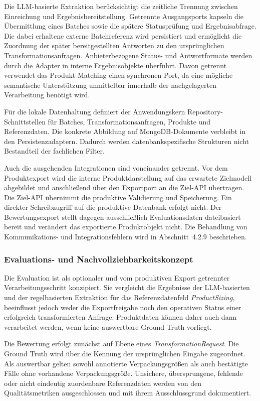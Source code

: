 Die LLM-basierte Extraktion berücksichtigt die zeitliche Trennung zwischen Einreichung und Ergebnisbereitstellung. Getrennte Ausgangsports kapseln die Übermittlung 
eines Batches sowie die spätere Statusprüfung und Ergebnisabfrage. Die dabei erhaltene externe Batchreferenz wird persistiert und ermöglicht die Zuordnung der später 
bereitgestellten Antworten zu den ursprünglichen Transformationsanfragen. Anbieterbezogene Status- und Antwortformate werden durch die Adapter in interne Ergebnisobjekte 
überführt. Davon getrennt verwendet das Produkt-Matching einen synchronen Port, da eine mögliche semantische Unterstützung unmittelbar innerhalb der nachgelagerten 
Verarbeitung benötigt wird.

Für die lokale Datenhaltung definiert der Anwendungskern Repository-Schnittstellen für Batches, Transformationsanfragen, Produkte und Referenzdaten. Die konkrete 
Abbildung auf MongoDB-Dokumente verbleibt in den Persistenzadaptern. Dadurch werden datenbankspezifische Strukturen nicht Bestandteil der fachlichen Filter.

Auch die ausgehenden Integrationen sind voneinander getrennt. Vor dem Produktexport wird die interne Produktdarstellung auf das erwartete Zielmodell abgebildet und 
anschließend über den Exportport an die Ziel-API übertragen. Die Ziel-API übernimmt die produktive Validierung und Speicherung. Ein direkter Schreibzugriff auf die 
produktive Datenbank erfolgt nicht. Der Bewertungsexport stellt dagegen ausschließlich Evaluationsdaten dateibasiert bereit und verändert das exportierte Produktobjekt 
nicht. Die Behandlung von Kommunikations- und Integrationsfehlern wird in Abschnitt~4.2.9 beschrieben.

\subsubsection{Evaluations- und Nachvollziehbarkeitskonzept}

Die Evaluation ist als optionaler und vom produktiven Export getrennter Verarbeitungsschritt konzipiert. Sie vergleicht die Ergebnisse der LLM-basierten und der 
regelbasierten Extraktion für das Referenzdatenfeld \textit{ProductSizing}, beeinflusst jedoch weder die Exportfreigabe noch den operativen Status einer erfolgreich 
transformierten Anfrage. Produktdaten können daher auch dann verarbeitet werden, wenn keine auswertbare Ground Truth vorliegt.

Die Bewertung erfolgt zunächst auf Ebene eines \textit{TransformationRequest}. Die Ground Truth wird über die Kennung der ursprünglichen Eingabe zugeordnet. Als auswertbar 
gelten sowohl annotierte Verpackungsgrößen als auch bestätigte Fälle ohne vorhandene Verpackungsgröße. Unsichere, übersprungene, fehlende oder nicht eindeutig zuordenbare 
Referenzdaten werden von den Qualitätsmetriken ausgeschlossen und mit ihrem Ausschlussgrund dokumentiert.

